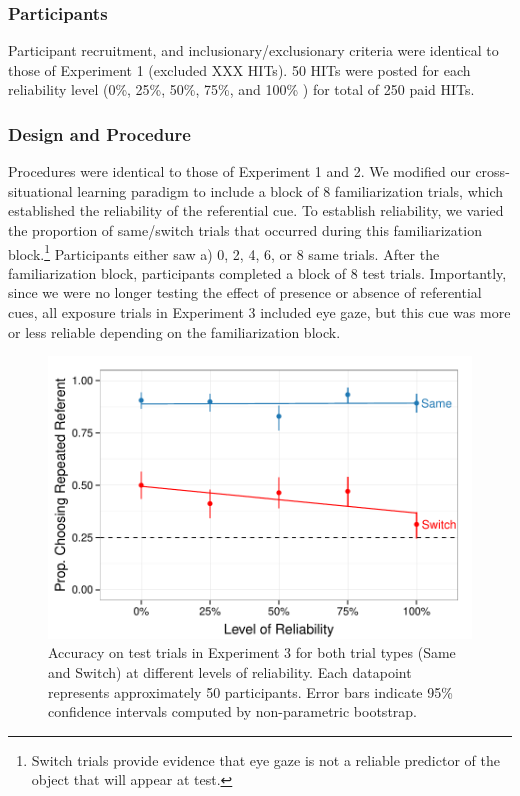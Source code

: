 \documentclass[10pt,letterpaper]{article}
\begin{document}
\subsubsection{Participants}
Participant recruitment, and inclusionary/exclusionary criteria were identical to those of Experiment 1 (excluded XXX HITs). 50 HITs were posted for each reliability level (0\%, 25\%, 50\%, 75\%, and 100\% ) for total of 250 paid HITs.  

\subsubsection{Design and Procedure}

Procedures were identical to those of Experiment 1 and 2. We modified our cross-situational learning paradigm to include a block of 8 familiarization trials, which established the reliability of the referential cue. To establish reliability, we varied the proportion of same/switch trials that occurred during this familiarization block.\footnote{Switch trials provide evidence that eye gaze is not a reliable predictor of the object that will appear at test.} Participants either saw a) 0, 2, 4, 6, or 8 same trials. After the familiarization block, participants completed a block of 8 test trials. Importantly, since we were no longer testing the effect of presence or absence of referential cues, all exposure trials in Experiment 3 included eye gaze, but this cue was more or less reliable depending on the familiarization block.

\begin{figure}[t!]
\begin{center}
\includegraphics[scale=0.35]{plots_figs/acc-test-expt3}
\end{center}
\caption{Accuracy on test trials in Experiment 3 for both trial types (Same and Switch) at different levels of reliability. Each datapoint represents 
approximately 50 participants. Error bars indicate 95\% confidence intervals 
computed by non-parametric bootstrap.}
\end{figure}
\end{document}
